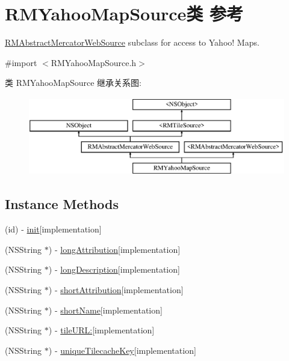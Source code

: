 \hypertarget{interface_r_m_yahoo_map_source}{\section{R\-M\-Yahoo\-Map\-Source类 参考}
\label{interface_r_m_yahoo_map_source}
}


\hyperlink{interface_r_m_abstract_mercator_web_source}{R\-M\-Abstract\-Mercator\-Web\-Source} subclass for access to Yahoo! Maps.  




{\ttfamily \#import $<$R\-M\-Yahoo\-Map\-Source.\-h$>$}

类 R\-M\-Yahoo\-Map\-Source 继承关系图\-:\begin{figure}[H]
\begin{center}
\leavevmode
\includegraphics[height=3.425076cm]{interface_r_m_yahoo_map_source}
\end{center}
\end{figure}
\subsection*{Instance Methods}
\begin{DoxyCompactItemize}
\item 
(id) -\/ \hyperlink{interface_r_m_yahoo_map_source_ad3bb94f78cc1a8acb1f5a351c25976f2}{init}{\ttfamily  \mbox{[}implementation\mbox{]}}
\item 
(N\-S\-String $\ast$) -\/ \hyperlink{interface_r_m_yahoo_map_source_a3304e958de6f104c62db2cbba5003172}{long\-Attribution}{\ttfamily  \mbox{[}implementation\mbox{]}}
\item 
(N\-S\-String $\ast$) -\/ \hyperlink{interface_r_m_yahoo_map_source_ab368158d1562e382a66495d10778ced0}{long\-Description}{\ttfamily  \mbox{[}implementation\mbox{]}}
\item 
(N\-S\-String $\ast$) -\/ \hyperlink{interface_r_m_yahoo_map_source_ae36d15de280147b8decd16d758874689}{short\-Attribution}{\ttfamily  \mbox{[}implementation\mbox{]}}
\item 
(N\-S\-String $\ast$) -\/ \hyperlink{interface_r_m_yahoo_map_source_ad41852333c9fbdba9664a56271ebf56e}{short\-Name}{\ttfamily  \mbox{[}implementation\mbox{]}}
\item 
(N\-S\-String $\ast$) -\/ \hyperlink{interface_r_m_yahoo_map_source_a7e78f247de9a7ad3a6adcb1694d15380}{tile\-U\-R\-L\-:}{\ttfamily  \mbox{[}implementation\mbox{]}}
\item 
(N\-S\-String $\ast$) -\/ \hyperlink{interface_r_m_yahoo_map_source_aef91c1e282958b4c0f69e3ca885e28e9}{unique\-Tilecache\-Key}{\ttfamily  \mbox{[}implementation\mbox{]}}
\end{DoxyCompactItemize}
